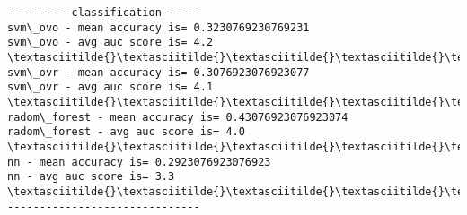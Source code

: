 \documentclass[11pt]{article}
\begin{document}
    \begin{Verbatim}[commandchars=\\\{\}]
----------classification------
svm\_ovo - mean accuracy is= 0.3230769230769231
svm\_ovo - avg auc score is= 4.2
\textasciitilde{}\textasciitilde{}\textasciitilde{}\textasciitilde{}\textasciitilde{}\textasciitilde{}\textasciitilde{}\textasciitilde{}\textasciitilde{}\textasciitilde{}\textasciitilde{}\textasciitilde{}\textasciitilde{}\textasciitilde{}\textasciitilde{}\textasciitilde{}\textasciitilde{}\textasciitilde{}\textasciitilde{}\textasciitilde{}\textasciitilde{}\textasciitilde{}\textasciitilde{}\textasciitilde{}\textasciitilde{}\textasciitilde{}\textasciitilde{}\textasciitilde{}\textasciitilde{}
svm\_ovr - mean accuracy is= 0.3076923076923077
svm\_ovr - avg auc score is= 4.1
\textasciitilde{}\textasciitilde{}\textasciitilde{}\textasciitilde{}\textasciitilde{}\textasciitilde{}\textasciitilde{}\textasciitilde{}\textasciitilde{}\textasciitilde{}\textasciitilde{}\textasciitilde{}\textasciitilde{}\textasciitilde{}\textasciitilde{}\textasciitilde{}\textasciitilde{}\textasciitilde{}\textasciitilde{}\textasciitilde{}\textasciitilde{}\textasciitilde{}\textasciitilde{}\textasciitilde{}\textasciitilde{}\textasciitilde{}\textasciitilde{}\textasciitilde{}\textasciitilde{}
radom\_forest - mean accuracy is= 0.43076923076923074
radom\_forest - avg auc score is= 4.0
\textasciitilde{}\textasciitilde{}\textasciitilde{}\textasciitilde{}\textasciitilde{}\textasciitilde{}\textasciitilde{}\textasciitilde{}\textasciitilde{}\textasciitilde{}\textasciitilde{}\textasciitilde{}\textasciitilde{}\textasciitilde{}\textasciitilde{}\textasciitilde{}\textasciitilde{}\textasciitilde{}\textasciitilde{}\textasciitilde{}\textasciitilde{}\textasciitilde{}\textasciitilde{}\textasciitilde{}\textasciitilde{}\textasciitilde{}\textasciitilde{}\textasciitilde{}\textasciitilde{}
nn - mean accuracy is= 0.2923076923076923
nn - avg auc score is= 3.3
\textasciitilde{}\textasciitilde{}\textasciitilde{}\textasciitilde{}\textasciitilde{}\textasciitilde{}\textasciitilde{}\textasciitilde{}\textasciitilde{}\textasciitilde{}\textasciitilde{}\textasciitilde{}\textasciitilde{}\textasciitilde{}\textasciitilde{}\textasciitilde{}\textasciitilde{}\textasciitilde{}\textasciitilde{}\textasciitilde{}\textasciitilde{}\textasciitilde{}\textasciitilde{}\textasciitilde{}\textasciitilde{}\textasciitilde{}\textasciitilde{}\textasciitilde{}\textasciitilde{}
------------------------------

    \end{Verbatim}
\end{document}
